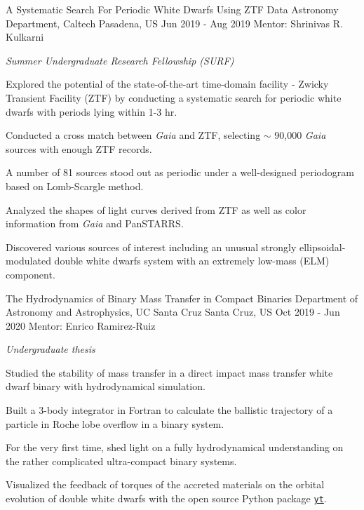 \begin{cvexperiences}
\cvexperience
{A Systematic Search For Periodic White Dwarfs Using ZTF Data} %
{Astronomy Department, Caltech} %
{Pasadena, US} %
{Jun 2019 - Aug 2019} %
{Mentor: Shrinivas R. Kulkarni}
{ %
	\begin{cvitems}
		\item {\textit{Summer Undergraduate Research Fellowship (SURF)}}
		\item {Explored the potential of the state-of-the-art time-domain facility - Zwicky Transient Facility (ZTF) by conducting a systematic search for periodic white dwarfs with periods lying within 1-3 hr.}
		\item {Conducted a cross match between \textit{Gaia} and ZTF, selecting $\sim$ 90,000 \textit{Gaia} sources with enough ZTF records.}
		\item {A number of 81 sources stood out as periodic under a well-designed periodogram based on Lomb-Scargle method.}
		\item {Analyzed the shapes of light curves derived from ZTF as well as color information from \textit{Gaia} and PanSTARRS.}
		\item {Discovered various sources of interest including an unusual strongly ellipsoidal-modulated double white dwarfs system with an extremely low-mass (ELM) component.}
	\end{cvitems}
}

\cvexperience
{The Hydrodynamics of Binary Mass Transfer in Compact Binaries} %
{Department of Astronomy and Astrophysics, UC Santa Cruz} %
{Santa Cruz, US} %
{Oct 2019 - Jun 2020} %
{Mentor: Enrico Ramirez-Ruiz}
{ %
	\begin{cvitems}
		\item {\textit{Undergraduate thesis}}
		\item {Studied the stability of mass transfer in a direct impact mass transfer white dwarf binary with hydrodynamical simulation.}
		\item {Built a 3-body integrator in Fortran to calculate the ballistic trajectory of a particle in Roche lobe overflow in a binary system.}
		\item {For the very first time, shed light on a fully hydrodynamical understanding on the rather complicated ultra-compact binary systems.}
		\item {Visualized the feedback of torques of the accreted materials on the orbital evolution of double white dwarfs with the open source Python package \href{https://yt-project.org}{\texttt{yt}}.}
	\end{cvitems}
}


\end{cvexperiences}
